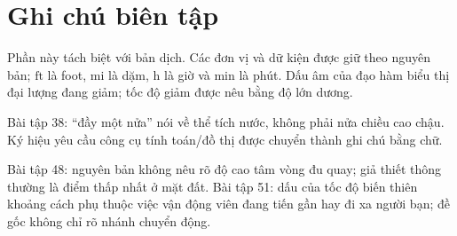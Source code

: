 \documentclass[12pt,a4paper]{article}
\begin{document}
\section*{Ghi chú biên tập}
Phần này tách biệt với bản dịch. Các đơn vị và dữ kiện được giữ theo nguyên bản; $\mathrm{ft}$ là foot, $\mathrm{mi}$ là dặm, $\mathrm{h}$ là giờ và $\mathrm{min}$ là phút. Dấu âm của đạo hàm biểu thị đại lượng đang giảm; tốc độ giảm được nêu bằng độ lớn dương.

Bài tập 38: “đầy một nửa” nói về thể tích nước, không phải nửa chiều cao chậu. Ký hiệu yêu cầu công cụ tính toán/đồ thị được chuyển thành ghi chú bằng chữ.

Bài tập 48: nguyên bản không nêu rõ độ cao tâm vòng đu quay; giả thiết thông thường là điểm thấp nhất ở mặt đất. Bài tập 51: dấu của tốc độ biến thiên khoảng cách phụ thuộc việc vận động viên đang tiến gần hay đi xa người bạn; đề gốc không chỉ rõ nhánh chuyển động.
\end{document}
